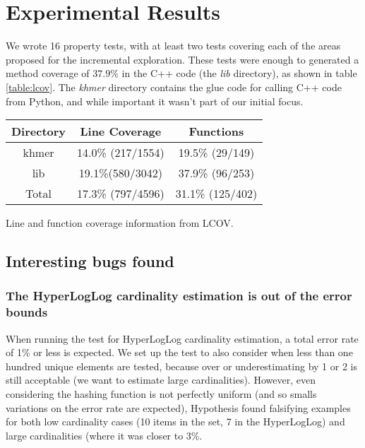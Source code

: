 \documentclass[preprint,nocopyrightspace]{sig-alternate}
\begin{document}
\section{Experimental Results}

We wrote 16 property tests,
with at least two tests covering each of the areas proposed for the incremental exploration.
These tests were enough to generated a method coverage of $37.9\%$ in the C++ code (the \emph{lib} directory),
as shown in table \ref{table:lcov}.
The \emph{khmer} directory contains the glue code for calling C++ code from Python,
and while important it wasn't part of our initial focus.

\noindent
\begin{minipage}{\columnwidth}
  \captionsetup{type=table}
  \centering
  \begin{tabular}{|c|c|c|}
  \toprule
  Directory & Line Coverage & Functions \\
  \midrule
  khmer		& 14.0\% (217/1554)	& 19.5\% (29/149) \\
  lib		& 19.1\%(580/3042)	& 37.9\% (96/253) \\
  Total		& 17.3\% (797/4596)	& 31.1\% (125/402) \\
  \bottomrule
  \end{tabular}
  \medskip

  \caption{Line and function coverage information from LCOV.}\label{table:lcov}
\end{minipage}

\subsection{Interesting bugs found}

\subsubsection{The HyperLogLog cardinality estimation is out of the error bounds}

When running the test for HyperLogLog cardinality estimation,
a total error rate of 1\% or less is expected.
We set up the test to also consider when less than one hundred unique elements are tested,
because over or underestimating by 1 or 2 is still acceptable (we want to estimate large cardinalities).
However,
even considering the hashing function is not perfectly uniform (and so smalls variations on the error rate are expected),
Hypothesis found falsifying examples for both low cardinality cases (10 items in the set, 7 in the HyperLogLog) and large cardinalities (where it was closer to 3\%.
\end{document}
